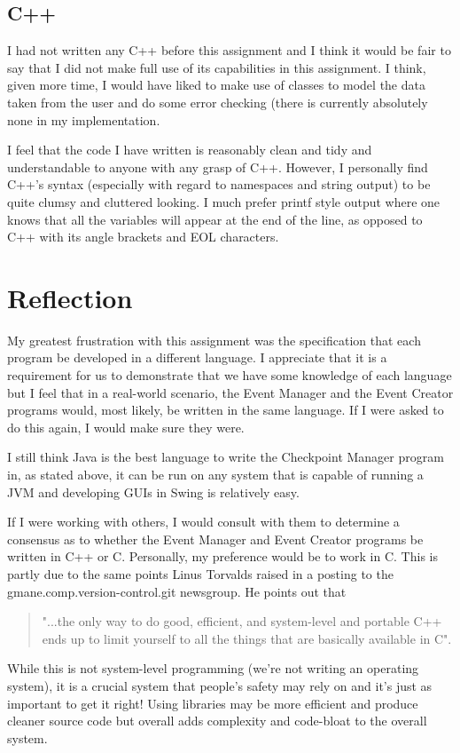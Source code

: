 \documentclass[a4paper, twoside]{article}
\begin{document}
\subsection{C++}
I had not written any C++ before this assignment and I think it would be fair to
say that I did not make full use of its capabilities in this assignment. I
think, given more time, I would have liked to make use of classes to model the
data taken from the user and do some error checking (there is currently
absolutely none in my implementation.

I feel that the code I have written is reasonably clean and tidy and
understandable to anyone with any grasp of C++. However, I personally find C++'s
syntax (especially with regard to namespaces and string output) to be quite
clumsy and cluttered looking. I much prefer printf style output where one knows
that all the variables will appear at the end of the line, as opposed to C++
with its angle brackets and EOL characters.

\section{Reflection}
My greatest frustration with this assignment was the specification that each
program be developed in a different language. I appreciate that it is a
requirement for us to demonstrate that we have some knowledge of each language
but I feel that in a real-world scenario, the Event Manager and the Event
Creator programs would, most likely, be written in the same language. If I were
asked to do this again, I would make sure they were.

I still think Java is the best language to write the Checkpoint Manager program
in, as stated above, it can be run on any system that is capable of running a
JVM and developing GUIs in Swing is relatively easy.

If I were working with others, I would consult with them to determine a
consensus as to whether the Event Manager and Event Creator programs be written
in C++ or C. Personally, my preference would be to work in C. This is partly due
to the same points Linus Torvalds raised in a posting to the
gmane.comp.version-control.git newsgroup. He points out that
\begin{quotation}
	"...the only way to do good, efficient, and system-level and portable C++ ends
	up to limit yourself to all the things that are basically available in C".
\end{quotation}
While this is not system-level programming (we're not writing an operating
system), it is a crucial system that people's safety may rely on and it's just
as important to get it right! Using libraries may be more efficient and produce
cleaner source code but overall adds complexity and code-bloat to the overall
system.
\end{document}
